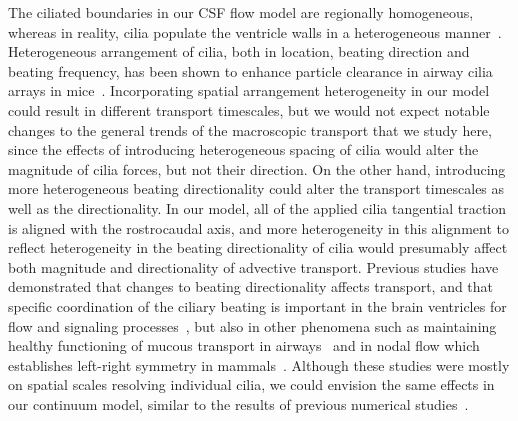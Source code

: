 \documentclass{WileyMSP-template}
\begin{document}
The ciliated boundaries in our CSF flow model are regionally homogeneous,
whereas in reality, cilia populate the ventricle walls in a
heterogeneous manner~\cite{Olstad2019CiliaryDevelopment}. Heterogeneous
arrangement of cilia, both in location, beating direction and beating frequency,
has been shown to enhance particle clearance in airway cilia arrays
in mice~\cite{Ramirez-SanJuan2020Multi-scaleArrays}.
Incorporating spatial arrangement heterogeneity in our model could
result in different transport timescales,
but we would not expect notable changes to the general trends of the macroscopic
transport that we study here, since the effects of introducing heterogeneous spacing
of cilia would alter the magnitude of cilia forces, but not their direction.
On the other hand, introducing more heterogeneous beating directionality could
alter the transport timescales as well as the directionality.
In our model, all of the applied cilia
tangential traction is aligned with the rostrocaudal axis, and more heterogeneity
in this alignment to reflect heterogeneity in the beating directionality of
cilia would presumably affect both magnitude and directionality of advective transport.
Previous studies have demonstrated that changes to beating directionality affects transport,
and that specific coordination of the ciliary beating is important in the brain ventricles for
flow and signaling processes~\cite{Eichele2020Cilia-drivenVentricle, Olstad2019CiliaryDevelopment,
Faubel2016Cilia-basedVentricles, Guirao2010CouplingCilia, Afzelius2004CiliaRelatedDiseases,
Pellicciotta2020Cilia},
but also in other phenomena such as maintaining healthy functioning of mucous transport in
airways~\cite{Rayner1996CiliarySyndrome, Schneiter2021Multi-scaleFunction,
Bustamante-Marin2019LackClearance, Tsukita2012CoordinatedFeet} and in nodal flow which establishes
left-right symmetry in mammals~\cite{Yoshiba2014RolesSymmetry, Hirokawa2006NodalAsymmetry,
Sawamoto2006NewBrain}.
Although these studies were mostly on spatial scales resolving individual cilia,
we could envision the same effects in our continuum model,
similar to the results of previous numerical studies~\cite{Ramirez-SanJuan2020Multi-scaleArrays,
Thouvenin2020OriginCanal, Yoshida2022EffectVentricles}. 
\end{document}
